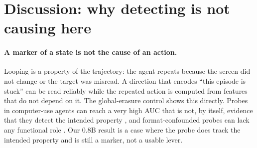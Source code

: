 \section{Discussion: why detecting is not causing here}
\label{sec:discussion}

\paragraph{A marker of a state is not the cause of an action.} Looping is a property of the trajectory: the agent repeats because the screen did not change or the target was misread. A direction that encodes ``this episode is stuck'' can be read reliably while the repeated action is computed from features that do not depend on it. The global-erasure control shows this directly. Probes in computer-use agents can reach a very high AUC that is not, by itself, evidence that they detect the intended property \citep{li2026auc}, and format-confounded probes can lack any functional role \citep{sahoo2026format}. Our 0.8B result is a case where the probe does track the intended property and is still a marker, not a usable lever.

